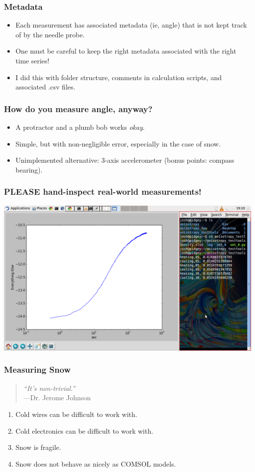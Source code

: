\documentclass{beamer}
\begin{document}
\begin{frame}
\frametitle{Metadata}
\begin{itemize}
\item Each measurement has associated metadata (ie, angle) that is not kept
track of by the needle probe.
\item One must be careful to keep the right metadata associated with the right
time series!
\item I did this with folder structure, comments in calculation scripts, and associated .csv files.
\end{itemize}
\end{frame}


\begin{frame}
\frametitle{How do you measure angle, anyway?}
\begin{itemize}
\item A protractor and a plumb bob works \emph{okay}.
\item Simple, but with non-negligible error, especially in the case of snow.
\item Unimplemented alternative: 3-axis accelerometer (bonus points: compass bearing).
\end{itemize}
\end{frame}


\begin{frame}
\frametitle{PLEASE hand-inspect real-world measurements!}
\begin{center}
\includegraphics[width=\textwidth]{fig/measurement_screenie.png}
\end{center}
\end{frame}


\begin{frame}
\frametitle{Measuring Snow}
\begin{quotation}
  {\it ``It's non-trivial.''} \\ 
  \hspace*{1in}---Dr. Jerome Johnson
\end{quotation}
\begin{enumerate}
\item Cold wires can be difficult to work with.
\item Cold electronics can be difficult to work with.
\item Snow is fragile.
\item Snow does not behave as nicely as COMSOL models.
\end{enumerate}
\end{frame}
\end{document}
